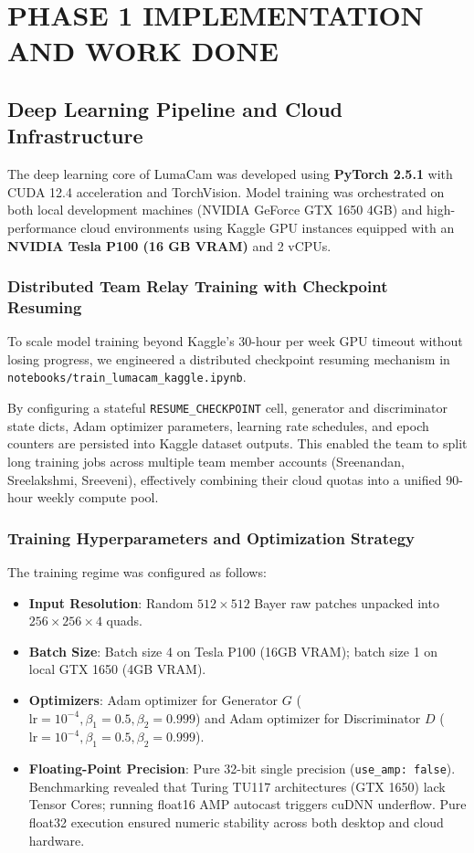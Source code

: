 \chapter{PHASE 1 IMPLEMENTATION AND WORK DONE}

\section{Deep Learning Pipeline and Cloud Infrastructure}
The deep learning core of LumaCam was developed using \textbf{PyTorch 2.5.1} with CUDA 12.4 acceleration and TorchVision. Model training was orchestrated on both local development machines (NVIDIA GeForce GTX 1650 4GB) and high-performance cloud environments using Kaggle GPU instances equipped with an \textbf{NVIDIA Tesla P100 (16 GB VRAM)} and 2 vCPUs.

\subsection{Distributed Team Relay Training with Checkpoint Resuming}
To scale model training beyond Kaggle's 30-hour per week GPU timeout without losing progress, we engineered a distributed checkpoint resuming mechanism in \texttt{notebooks/train\_lumacam\_kaggle.ipynb}. 

By configuring a stateful \texttt{RESUME\_CHECKPOINT} cell, generator and discriminator state dicts, Adam optimizer parameters, learning rate schedules, and epoch counters are persisted into Kaggle dataset outputs. This enabled the team to split long training jobs across multiple team member accounts (Sreenandan, Sreelakshmi, Sreeveni), effectively combining their cloud quotas into a unified 90-hour weekly compute pool.

\subsection{Training Hyperparameters and Optimization Strategy}
The training regime was configured as follows:
\begin{itemize}
    \item \textbf{Input Resolution}: Random $512 \times 512$ Bayer raw patches unpacked into $256 \times 256 \times 4$ quads.
    \item \textbf{Batch Size}: Batch size 4 on Tesla P100 (16GB VRAM); batch size 1 on local GTX 1650 (4GB VRAM).
    \item \textbf{Optimizers}: Adam optimizer for Generator $G$ ($\text{lr} = 10^{-4}, \beta_1 = 0.5, \beta_2 = 0.999$) and Adam optimizer for Discriminator $D$ ($\text{lr} = 10^{-4}, \beta_1 = 0.5, \beta_2 = 0.999$).
    \item \textbf{Floating-Point Precision}: Pure 32-bit single precision (\texttt{use\_amp: false}). Benchmarking revealed that Turing TU117 architectures (GTX 1650) lack Tensor Cores; running float16 AMP autocast triggers cuDNN underflow. Pure float32 execution ensured numeric stability across both desktop and cloud hardware.
\end{itemize}

